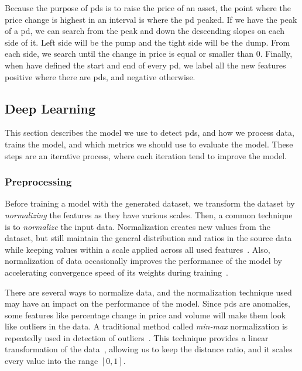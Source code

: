 Because the purpose of \acp{pd} is to raise the price of an asset, the point where the price change is highest in an interval is where the \ac{pd} peaked. If we have the peak of a \ac{pd}, we can search from the peak and down the descending slopes on each side of it. Left side will be the pump and the tight side will be the dump. From each side, we search until the change in price is equal or smaller than $0$. Finally, when have defined the start and end of every \ac{pd}, we label all the new features positive where there are \acp{pd}, and negative otherwise.

\subsection{Deep Learning}
This section describes the model we use to detect \acp{pd}, and how we process data, trains the model, and which metrics we should use to evaluate the model. These steps are an iterative process, where each iteration tend to improve the model.

\subsubsection{Preprocessing}
Before training a model with the generated dataset, we transform the dataset by \emph{normalizing} the features as they have various scales. Then, a common technique is to \emph{normalize} the input data. Normalization creates new values from the dataset, but still maintain the general distribution and ratios in the source data while keeping values within a scale applied across all used features~\cite{normalize_data}. Also, normalization of data occasionally improves the performance of the model by accelerating convergence speed of its weights during training~\cite{sola1997importance, normalize_google}.

There are several ways to normalize data, and the normalization technique used may have an impact on the performance of the model. Since \acp{pd} are anomalies, some features like percentage change in price and volume will make them look like outliers in the data. A traditional method called \emph{min-max} normalization is repeatedly used in detection of outliers~\cite{campos2016evaluation, goldstein2016comparative}. This technique provides a linear transformation of the data~\cite{panda2014smoothing}, allowing us to keep the distance ratio, and it scales every value into the range $[0,1]$.



